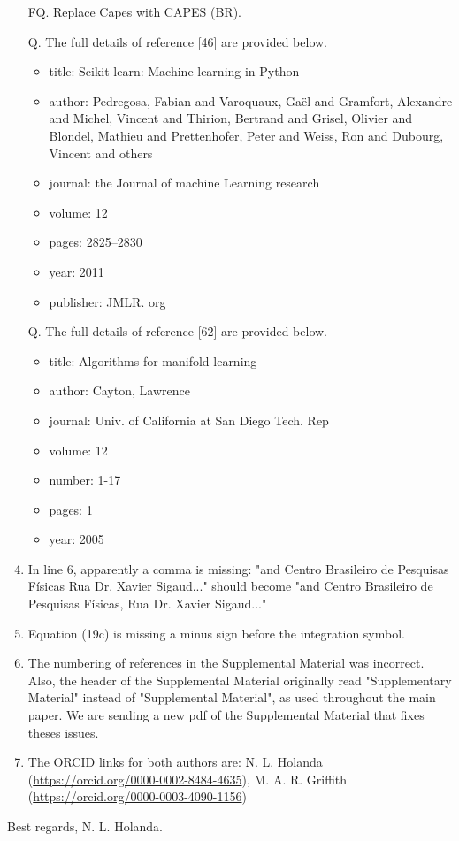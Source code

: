 \documentclass[10pt]{revtex4-1}
\begin{document}
\begin{enumerate}
\begin{itemize}
    \end{itemize}
    \item[FQ.] Replace Capes with CAPES (BR).
    \item[Q.] The full details of reference [46] are provided below.
    \begin{itemize}
    \item title: Scikit-learn: Machine learning in Python
    \item author: Pedregosa, Fabian and Varoquaux, Ga{\"e}l and Gramfort, Alexandre and Michel, Vincent and Thirion, Bertrand and Grisel, Olivier and Blondel, Mathieu and Prettenhofer, Peter and Weiss, Ron and Dubourg, Vincent and others
    \item journal: the Journal of machine Learning research
    \item volume: 12
    \item pages: 2825--2830
    \item year: 2011
    \item publisher: JMLR. org
    \end{itemize}
    \item[Q.] The full details of reference [62] are provided below.
    \begin{itemize}
    \item title: Algorithms for manifold learning
    \item author: Cayton, Lawrence
    \item journal: Univ. of California at San Diego Tech. Rep
    \item volume: 12
    \item number: 1-17
    \item pages: 1
    \item year: 2005
    \end{itemize}
    \item In line 6, apparently a comma is missing: "and Centro Brasileiro de Pesquisas F\'isicas Rua Dr. Xavier Sigaud..." should become "and Centro Brasileiro de Pesquisas F\'isicas, Rua Dr. Xavier Sigaud..." 
    \item Equation (19c) is missing a minus sign before the integration symbol.  
    \item The numbering of references in the Supplemental Material was incorrect. Also, the header of the Supplemental Material originally read "Supplementary Material" instead of "Supplemental Material", as used throughout the main paper. We are sending a new pdf of the Supplemental Material that fixes theses issues. 
    \item The ORCID links for both authors are: N. L. Holanda (\url{https://orcid.org/0000-0002-8484-4635}), M. A. R. Griffith (\url{https://orcid.org/0000-0003-4090-1156})

\end{enumerate}

Best regards,
N. L. Holanda.
\end{document}
